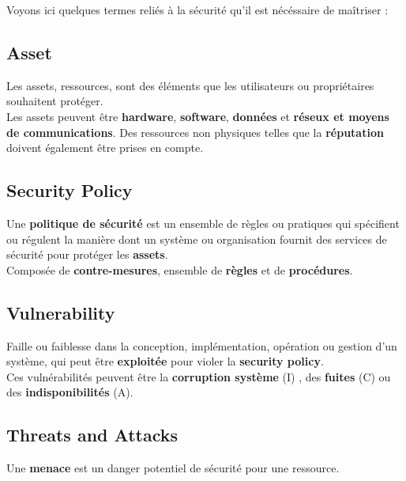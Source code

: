 \documentclass{report}
\begin{document}
		Voyons ici quelques termes reliés à la sécurité qu'il est nécéssaire de maîtriser : \\

		\subsection{Asset}

			Les assets, ressources, sont des éléments que les utilisateurs ou propriétaires souhaitent protéger.\\

			Les assets peuvent être \textbf{hardware}, \textbf{software}, \textbf{données} et \textbf{réseux et moyens de communications}. Des ressources non physiques telles que la \textbf{réputation} doivent également être prises en compte.\\

		\subsection{Security Policy}

			Une \textbf{politique de sécurité} est un ensemble de règles ou pratiques qui spécifient ou régulent la manière dont un système ou organisation fournit des services de sécurité pour protéger les \textbf{assets}.\\

			Composée de \textbf{contre-mesures}, ensemble de \textbf{règles} et de \textbf{procédures}.\\

		\subsection{Vulnerability}

			Faille ou faiblesse dans la conception, implémentation, opération ou gestion d'un système, qui peut être \textbf{exploitée} pour violer la \textbf{security policy}.\\

			Ces vulnérabilités peuvent être la \textbf{corruption système} (I) , des \textbf{fuites} (C) ou des \textbf{indisponibilités} (A).\\

		\subsection{Threats and Attacks}

			Une \textbf{menace} est un danger potentiel de sécurité pour une ressource.\\
\end{document}
